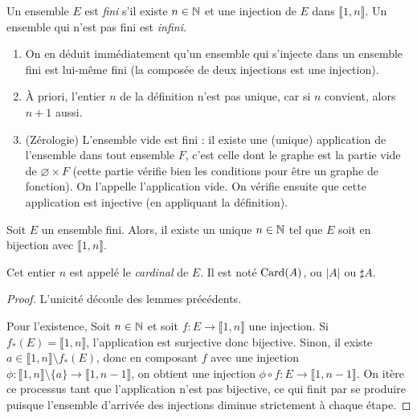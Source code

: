 \begin{definition}
Un ensemble $E$ est \emph{fini} s'il existe $n\in \mathbb{N}$ et une injection de $E$ dans $\llbracket 1,n\rrbracket$. Un ensemble qui n'est pas fini est \emph{infini}.
\end{definition}

\begin{remarque}
\begin{enumerate}[label=\alph*)]
\item On en déduit immédiatement qu'un ensemble qui s'injecte dans un ensemble fini est lui-même fini (la composée de deux injections est une injection).
\item À priori, l'entier $n$ de la définition n'est pas unique, car si $n$ convient, alors $n+1$ aussi.
\item (Zérologie) L'ensemble vide est fini : il existe une (unique) application de l'ensemble dans tout ensemble $F$, c'est celle dont le graphe est la partie vide de $\varnothing\times F$ (cette partie vérifie bien les conditions pour être un graphe de fonction). On l'appelle \og l'application vide\fg.
On vérifie ensuite que cette application est injective (en appliquant la définition).
\end{enumerate}
\end{remarque}


\begin{propdef}
Soit $E$ un ensemble fini. Alors, il existe un unique $n\in \mathbb{N}$ tel que $E$ soit en bijection avec $\llbracket 1,n\rrbracket$.

Cet entier $n$ est appelé le \emph{cardinal} de $E$. Il est noté $\operatorname{Card}(A)$, ou $|A|$ ou $\sharp A$.
\end{propdef}
\begin{proof}
L'unicité découle des lemmes précédents.

Pour l'existence, Soit $n\in \mathbb{N}$ et soit $f : E\to \llbracket 1,n\rrbracket$ une injection.
Si $f_*(E) = \llbracket 1,n\rrbracket$, l'application est surjective donc bijective.
Sinon, il existe $a\in \llbracket 1,n\rrbracket \setminus f_*(E)$, donc en composant $f$ avec une injection $\phi  : \llbracket 1,n\rrbracket \setminus \{a\} \to \llbracket 1,n-1\rrbracket$, on obtient une injection $\phi\circ f : E \to \llbracket 1,n-1\rrbracket$.
On itère ce processus tant que l'application n'est pas bijective, ce qui finit par se produire puisque l'ensemble d'arrivée des injections diminue strictement à chaque étape.
\end{proof}




